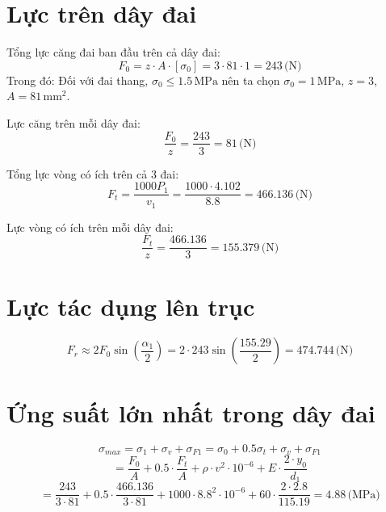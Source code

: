 \section{Lực trên dây đai}
Tổng lực căng đai ban đầu trên cả dây đai:
\begin{equation}
    F_0 = z \cdot A \cdot [\sigma_0] = 3 \cdot 81 \cdot 1 = 243 \, \text{(N)}
\end{equation}
Trong đó: Đối với đai thang, $\sigma_0 \leq 1.5 \, \text{MPa}$ nên ta chọn $\sigma_0 = 1 \, \text{MPa}$, $z = 3$, $A = 81 \, \text{mm}^2$.

Lực căng trên mỗi dây đai:
\begin{equation}
    \frac{F_0}{z} = \frac{243}{3} = 81 \, \text{(N)}
\end{equation}

Tổng lực vòng có ích trên cả 3 đai:
\begin{equation}
    F_t = \frac{1000P_1}{v_1} = \frac{1000 \cdot 4.102}{8.8} = 466.136 \, \text{(N)}
\end{equation}

Lực vòng có ích trên mỗi dây đai:
\begin{equation}
    \frac{F_t}{z} = \frac{466.136}{3} = 155.379 \, \text{(N)}
\end{equation}

\section{Lực tác dụng lên trục}
\begin{equation}
    F_r \approx 2F_0\sin\left(\frac{\alpha_1}{2}\right) = 2 \cdot 243 \sin\left(\frac{155.29}{2}\right) = 474.744 \, \text{(N)}
\end{equation}

\section{Ứng suất lớn nhất trong dây đai}
\begin{equation}
    \sigma_{max} = \sigma_1 + \sigma_v + \sigma_{F1} = \sigma_0 + 0.5\sigma_t + \sigma_v + \sigma_{F1}
\end{equation}
\begin{equation}
    = \frac{F_0}{A} + 0.5 \cdot \frac{F_t}{A} + \rho \cdot v^2 \cdot 10^{-6} + E \cdot \frac{2 \cdot y_0}{d_1}
\end{equation}
\[
    = \frac{243}{3 \cdot 81} + 0.5 \cdot \frac{466.136}{3 \cdot 81} + 1000 \cdot 8.8^2 \cdot 10^{-6} + 60 \cdot \frac{2 \cdot 2.8}{115.19} = 4.88 \, \text{(MPa)}
\]

